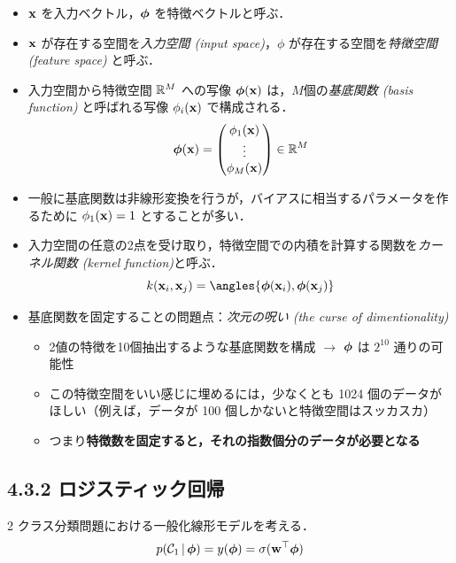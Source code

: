 \begin{itemize}
  \item ${\mathbf{x}}$ を入力ベクトル，$\boldsymbol{\phi}$ を特徴ベクトルと呼ぶ．
  \item ${\mathbf{x}}$ が存在する空間を\emph{入力空間 (input space)}，$\phi$ が存在する空間を\emph{特徴空間 (feature space)} と呼ぶ．
  \item 入力空間から特徴空間 $\mathbb{R}^M$ への写像 $\boldsymbol{\phi}({\mathbf{x}})$ は，$M$個の\emph{基底関数 (basis function)} と呼ばれる写像 $\phi_i({\mathbf{x}})$ で構成される．
  \[
\boldsymbol{\phi}({\mathbf{x}}) = \begin{pmatrix} \phi_1({\mathbf{x}}) \\ \vdots \\ \phi_M({\mathbf{x}}) \end{pmatrix} \in \mathbb{R}^M
  \]
  \item 一般に基底関数は非線形変換を行うが，バイアスに相当するパラメータを作るために $\phi_1({\mathbf{x}}) = 1$ とすることが多い．
  \item 入力空間の任意の2点を受け取り，特徴空間での内積を計算する関数を\emph{カーネル関数 (kernel function)}と呼ぶ．
  \[
    k(\vx_i, \vx_j) = \angles{\vphi(\vx_i), \vphi(\vx_j)}
  \]
  \item 基底関数を固定することの問題点：\emph{次元の呪い (the curse of dimentionality)}
  \begin{itemize}
    \item 2値の特徴を10個抽出するような基底関数を構成 $\rightarrow$ $\boldsymbol{\phi}$ は $2^{10}$ 通りの可能性
    \item この特徴空間をいい感じに埋めるには，少なくとも 1024 個のデータがほしい（例えば，データが 100 個しかないと特徴空間はスッカスカ）
    \item つまり\textbf{特徴数を固定すると，それの指数個分のデータが必要となる}
  \end{itemize}
\end{itemize}

\setcounter{equation}{86}
\subsection*{4.3.2 ロジスティック回帰}

2 クラス分類問題における一般化線形モデルを考える．
\begin{equation}
  p({\mathcal{C}}_1 \,|\, \boldsymbol{\phi}) = y(\boldsymbol{\phi}) = \sigma({\mathbf{w}}^\top \boldsymbol{\phi})
\end{equation}

